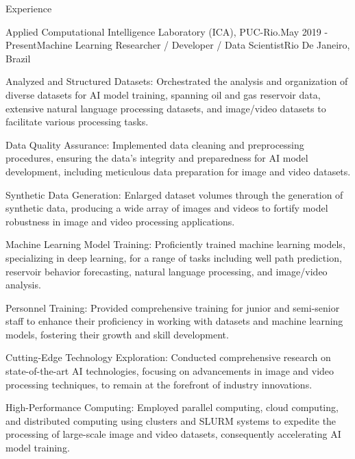 \documentclass{resume} %
\begin{document}
    
    \begin{rSection}{Experience}

        \begin{rSubsection}{Applied Computational Intelligence Laboratory (ICA), PUC-Rio.}{May  2019 - Present}{Machine Learning Researcher / Developer / Data Scientist}{Rio De Janeiro, Brazil}
            {\normalfont 
            \item Analyzed and Structured Datasets: Orchestrated the analysis and organization of diverse datasets for AI model training, spanning oil and gas reservoir data, extensive natural language processing datasets, and image/video datasets to facilitate various processing tasks.
            \item Data Quality Assurance: Implemented data cleaning and preprocessing procedures, ensuring the data's integrity and preparedness for AI model development, including meticulous data preparation for image and video datasets.
            \item Synthetic Data Generation: Enlarged dataset volumes through the generation of synthetic data, producing a wide array of images and videos to fortify model robustness in image and video processing applications.
            \item Machine Learning Model Training: Proficiently trained machine learning models, specializing in deep learning, for a range of tasks including well path prediction, reservoir behavior forecasting, natural language processing, and image/video analysis.
            \item Personnel Training: Provided comprehensive training for junior and semi-senior staff to enhance their proficiency in working with datasets and machine learning models, fostering their growth and skill development.
            \item Cutting-Edge Technology Exploration: Conducted comprehensive research on state-of-the-art AI technologies, focusing on advancements in image and video processing techniques, to remain at the forefront of industry innovations.
            \item High-Performance Computing: Employed parallel computing, cloud computing, and distributed computing using clusters and SLURM systems to expedite the processing of large-scale image and video datasets, consequently accelerating AI model training.
}
\end{rSubsection}
\end{rSection}
\end{document}
